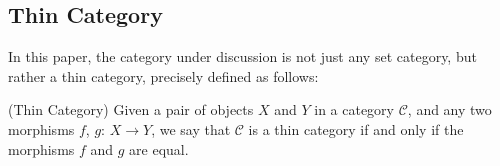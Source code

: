 

\subsection{Thin Category}


In this paper, the category under discussion is not just any set category, but rather a thin category, precisely defined as follows:





\begin{definition}(Thin Category) \cite{roman2017introduction} Given a pair of objects $X$ and $Y$ in a category $\mathcal{C}$, and any two morphisms $f$, $g$: $X \to Y$, we say that $\mathcal{C}$ is a thin category if and only if the morphisms $f$ and $g$ are equal. 
\end{definition}




